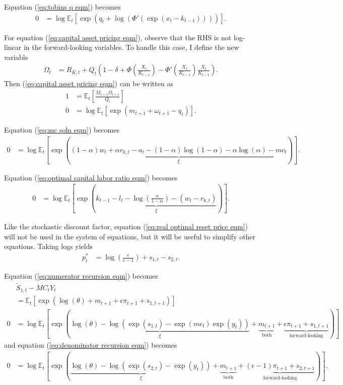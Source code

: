 \documentclass[12 pt, oneside]{article}
\theoremstyle{definition}
\theoremstyle{definition}
\theoremstyle{definition}
\newcommand{\E}{\mathbb{E}}
\begin{document}
Equation (\ref{eq:tobins q eqm}) becomes
\begin{align*}
  0 & = \log\E_t\left[\exp\left(q_t + \log\left(\Phi'\left(\exp(x_t - k_{t - 1})\right)\right)\right)\right].
\end{align*}

For equation (\ref{eq:capital asset pricing eqm}), observe that the RHS is not log-linear in the forward-looking variables. To handle this case, I define the new variable
\begin{align}\label{eq:Omega defn}
  \Omega_t & = R_{K, t} + Q_t\left(1 - \delta + \Phi\left(\frac{X_t}{K_{t - 1}}\right) - \Phi'\left(\frac{X_t}{K_{t - 1}}\right)\frac{X_t}{K_{t - 1}}\right).
\end{align}
Then (\ref{eq:capital asset pricing eqm}) can be written as
\begin{align*}
  1 & = \E_t\left[\frac{M_{t + 1} \Omega_{t + 1}}{Q_t}\right]\\
  0 & = \log\E_t\left[\exp(m_{t + 1} + \omega_{t + 1} - q_t)\right].
\end{align*}

Equation (\ref{eq:mc soln eqm}) becomes
\begin{align*}
  0 & = \log\E_t\left[\exp\left(\underbrace{(1 - \alpha)w_t + \alpha r_{k, t} - a_t -(1 - \alpha)\log(1 - \alpha) - \alpha \log(\alpha) - mc_t}_{\xi} \right)\right].
\end{align*}

Equation (\ref{eq:optimal capital labor ratio eqm}) becomes
\begin{align*}
  0 & = \log\E_t\left[\exp\left(\underbrace{k_{t - 1} - l_t - \log\left(\frac{\alpha}{1 - \alpha}\right) - (w_t - r_{k, t})}_{\xi} \right)\right].
\end{align*}

Like the stochastic discount factor, equation (\ref{eq:real optimal reset price eqm}) will not be used in the system of equations, but it will be useful to simplify other equations. Taking logs yields
\begin{align*}
  p_t^* & = \log\left(\frac{\epsilon}{\epsilon - 1}\right) + s_{1, t} - s_{2, t}.
\end{align*}

Equation (\ref{eq:numerator recursion eqm}) becomes
\begin{align*}
  & \tilde{S}_{1, t} - MC_t Y_t\\
   & = \E_t\left[\exp\left(\log(\theta) + m_{t + 1} + \epsilon \pi_{t + 1} + s_{1, t + 1}\right)\right]\\
  0 & = \log\E_t\left[\exp\left(\underbrace{\log(\theta) - \log(\exp(s_{1, t}) - \exp(mc_t)\exp(y_t))}_{\xi} + \underbrace{m_{t + 1}}_{\text{both}} + \underbrace{\epsilon \pi_{t + 1} + s_{1, t + 1}}_{\text{forward-looking}}\right)\right]
\end{align*}
and equation (\ref{eq:denominator recursion eqm}) becomes
\begin{align*}
  0 & = \log\E_t\left[\exp\left(\underbrace{\log(\theta) - \log(\exp(s_{2, t}) - \exp(y_t))}_{\xi} + \underbrace{m_{t + 1}}_{\text{both}} + \underbrace{(\epsilon - 1) \pi_{t + 1} + s_{2, t + 1}}_{\text{forward-looking}}\right)\right].
\end{align*}
\end{document}
